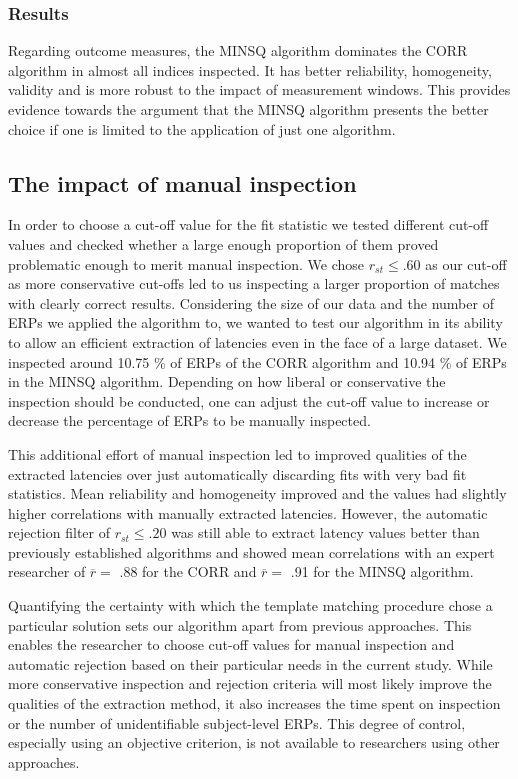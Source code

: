 \documentclass[
  man,floatsintext]{apa7}
\begin{document}
\hypertarget{results-1}{%
\subsubsection{Results}\label{results-1}}

Regarding outcome measures, the MINSQ algorithm dominates the CORR algorithm in almost all indices inspected. It has better reliability, homogeneity, validity and is more robust to the impact of measurement windows. This provides evidence towards the argument that the MINSQ algorithm presents the better choice if one is limited to the application of just one algorithm.

\hypertarget{the-impact-of-manual-inspection}{%
\subsection{The impact of manual inspection}\label{the-impact-of-manual-inspection}}

In order to choose a cut-off value for the fit statistic we tested different cut-off values and checked whether a large enough proportion of them proved problematic enough to merit manual inspection. We chose \(r_{st} \le .60\) as our cut-off as more conservative cut-offs led to us inspecting a larger proportion of matches with clearly correct results. Considering the size of our data and the number of ERPs we applied the algorithm to, we wanted to test our algorithm in its ability to allow an efficient extraction of latencies even in the face of a large dataset. We inspected around 10.75 \% of ERPs of the CORR algorithm and 10.94 \% of ERPs in the MINSQ algorithm. Depending on how liberal or conservative the inspection should be conducted, one can adjust the cut-off value to increase or decrease the percentage of ERPs to be manually inspected.

This additional effort of manual inspection led to improved qualities of the extracted latencies over just automatically discarding fits with very bad fit statistics. Mean reliability and homogeneity improved and the values had slightly higher correlations with manually extracted latencies. However, the automatic rejection filter of \(r_{st} \le .20\) was still able to extract latency values better than previously established algorithms and showed mean correlations with an expert researcher of \(\overline{r} =\) .88 for the CORR and \(\overline{r} =\) .91 for the MINSQ algorithm.

Quantifying the certainty with which the template matching procedure chose a particular solution sets our algorithm apart from previous approaches. This enables the researcher to choose cut-off values for manual inspection and automatic rejection based on their particular needs in the current study. While more conservative inspection and rejection criteria will most likely improve the qualities of the extraction method, it also increases the time spent on inspection or the number of unidentifiable subject-level ERPs. This degree of control, especially using an objective criterion, is not available to researchers using other approaches.
\end{document}
